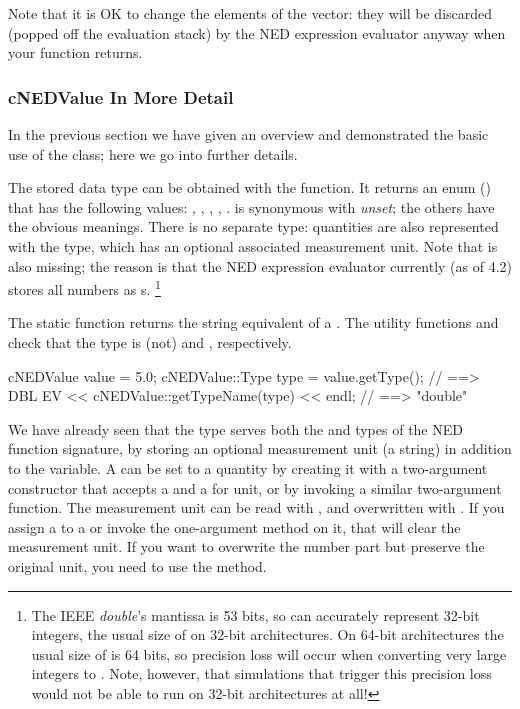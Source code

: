 \begin{note}
Note that it is OK to change the elements of the  vector: they
will be discarded (popped off the evaluation stack) by the NED expression
evaluator anyway when your function returns.
\end{note}


\subsubsection{cNEDValue In More Detail}

In the previous section we have given an overview and demonstrated the basic
use of the  class; here we go into further details.

The stored data type can be obtained with the  function.
It returns an enum () that has the following values:
, , , , .  is
synonymous with \textit{unset}; the others have the obvious meanings. There
is no separate  type: quantities are also represented with
the  type, which has an optional associated measurement unit. Note
that  is also missing; the reason is that the NED expression
evaluator currently (as of {\opp} 4.2) stores all numbers as s.
  \footnote{The IEEE \textit{double}'s mantissa is 53 bits, so 
  can accurately represent 32-bit integers, the usual size of  on
  32-bit architectures. On 64-bit architectures the usual size of 
  is 64 bits, so precision loss will occur when converting very large integers
  to . Note, however, that simulations that trigger this precision
  loss would not be able to run on 32-bit architectures at all!}

The  static function returns the string equivalent of
a . The utility functions  and
 check that the type is (not)  and ,
respectively.

\begin{cpp}
cNEDValue value = 5.0;
cNEDValue::Type type = value.getType(); // ==> DBL
EV << cNEDValue::getTypeName(type) << endl; // ==> "double"
\end{cpp}

We have already seen that the  type serves both the
 and  types of the NED function
signature, by storing an optional measurement unit (a string)
in addition to the  variable. A  can be set
to a quantity by creating it with a two-argument constructor that accepts
a  and a  for unit, or by invoking a similar
two-argument  function. The measurement unit can be read with
, and overwritten with . If you assign a
 to a  or invoke the one-argument
 method on it, that will clear the measurement unit. If you
want to overwrite the number part but preserve the original unit, you need
to use the  method.

